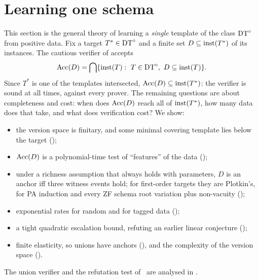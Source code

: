 \newcommand{\singleskel}{\mathrm{skel}}
\newcommand{\singleslots}{\mathrm{slots}}
\newcommand{\singleroot}{\mathrm{root}}
\newcommand{\singlebd}{\mathrm{b}}
\newcommand{\singleEsc}{\mathrm{Esc}}
\newcommand{\singleSym}{\mathsf{Sym}}
\newcommand{\singleScope}{\mathsf{Scope}}
\newcommand{\singleEq}{\mathsf{Eq}}
\newcommand{\singleFail}{\mathrm{Fail}}

\section{Learning one schema}\label{sec:single}

This section is the general theory of learning a \emph{single} template of the class $\mathrm{DT}^{\circ}$ from positive data. Fix a target $T^*\in\mathrm{DT}^{\circ}$ and a finite set $D\subseteq\mathrm{inst}(T^*)$ of its instances. The cautious verifier of  accepts
\[
\Acc(D)=\bigcap\{\inst(T):\ T\in\DT,\ D\subseteq\inst(T)\}.
\]
Since $T^*$ is one of the templates intersected, $\mathrm{Acc}(D)\subseteq\mathrm{inst}(T^*)$: the verifier is sound at all times, against every prover. The remaining questions are about completeness and cost: when does $\mathrm{Acc}(D)$ reach all of $\mathrm{inst}(T^*)$, how many data does that take, and what does verification cost? We show:
\begin{itemize}
\item the version space is finitary, and some minimal covering template lies below the target ();
\item $\mathrm{Acc}(D)$ is a polynomial-time test of ``features'' of the data ();
\item under a richness assumption that always holds with parameters, $D$ is an anchor iff three witness events hold; for first-order targets they are Plotkin's, for PA induction and every ZF schema root variation plus non-vacuity ();
\item exponential rates for random and for tagged data ();
\item a tight quadratic escalation bound, refuting an earlier linear conjecture ();
\item finite elasticity, so unions have anchors (), and the complexity of the version space ().
\end{itemize}
The union verifier and the refutation test of \DTRC\ are analysed in .

